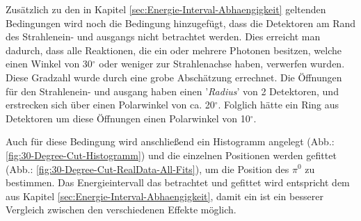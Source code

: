 \documentclass[a4paper,11pt,oneside,final,german,openbib,pdftex]{scrbook}
\begin{document}
{%



Zus\"atzlich zu den in Kapitel \ref{sec:Energie-Interval-Abhaengigkeit} geltenden Bedingungen wird noch die Bedingung hinzugef\"ugt, dass die Detektoren am Rand des Strahlenein- und ausgangs nicht betrachtet werden. Dies erreicht man dadurch, dass alle Reaktionen, die ein oder mehrere Photonen besitzen, welche einen Winkel von 30$^{\circ}$ oder weniger zur Strahlenachse haben, verwerfen wurden. Diese Gradzahl wurde durch eine grobe Absch\"atzung errechnet. Die \"Offnungen f\"ur den Strahlenein- und ausgang haben einen '\textit{Radius}' von 2 Detektoren, und erstrecken sich \"uber einen Polarwinkel von ca. 20$^{\circ}$. Folglich h\"atte ein Ring aus Detektoren um diese \"Offnungen einen Polarwinkel von 10$^{\circ}$. 
 
Auch f\"ur diese Bedingung wird anschlie{\ss}end ein Histogramm angelegt (Abb.: \ref{fig:30-Degree-Cut-Histogramm}) und die einzelnen Positionen werden gefittet (Abb.: \ref{fig:30-Degree-Cut-RealData-All-Fits}), um die Position des $\pi^0$ zu bestimmen. Das Energieintervall das betrachtet und gefittet wird entspricht dem aus Kapitel \ref{sec:Energie-Interval-Abhaengigkeit}, damit ein ist ein besserer Vergleich zwischen den verschiedenen Effekte m\"oglich.

}
\end{document}
